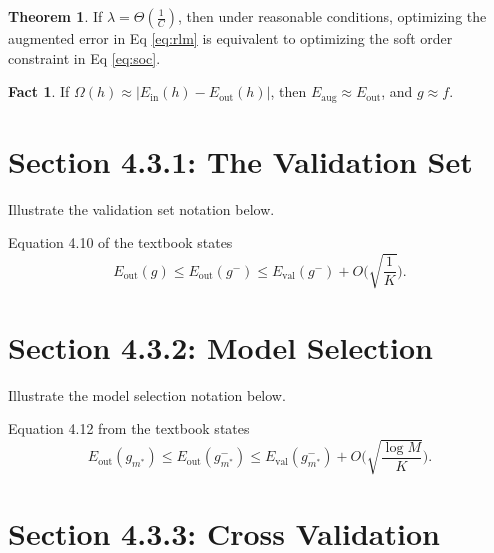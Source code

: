 \documentclass[10pt]{exam}
\theoremstyle{definition}
\newtheorem{fact}{Fact}
\newtheorem{theorem}{Theorem}
\newcommand{\Ein}{E_{\text{in}}}
\newcommand{\Eout}{E_{\text{out}}}
\newcommand{\Eval}{E_{\text{val}}}
\newcommand{\Eaug}{E_{\text{aug}}}
\newcommand{\Dtrain}{\mathcal D_{\text{train}}}
\newcommand{\Dval}{\mathcal D_{\text{val}}}
\begin{document}
\begin{theorem}
    If $\lambda = \Theta(\tfrac 1C)$, then under reasonable conditions, optimizing the augmented error in Eq \eqref{eq:rlm} is equivalent to optimizing the soft order constraint in Eq \eqref{eq:soc}.
\end{theorem}

\begin{fact}
    If $\Omega(h) \approx |\Ein(h) - \Eout(h)|$,
    then $\Eaug \approx \Eout$,
    and $g\approx f$.
\end{fact}

\newpage
\section*{Section 4.3.1: The Validation Set}


Illustrate the validation set notation below.


\vspace{3in}
\noindent
Equation 4.10 of the textbook states
\begin{equation*}
    \Eout(g) \le \Eout(g^-) \le \Eval(g^-) + O\bigg(\sqrt{\frac 1 {K}}\bigg)
    .
\end{equation*}

\newpage
\section*{Section 4.3.2: Model Selection}

Illustrate the model selection notation below.

\vspace{4in}

Equation 4.12 from the textbook states 
\begin{equation*}
    \Eout(g_{m^*}) \le
    \Eout(g^{-}_{m^*}) \le \Eval(g^-_{m^*}) + O\bigg(\sqrt{\frac{\log M}{K}}\bigg).
\end{equation*}

\newpage
\section*{Section 4.3.3: Cross Validation}
\end{document}
